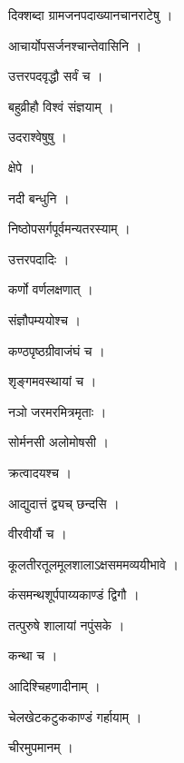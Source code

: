 \documentclass[10pt, openany]{book}
\begin{document}
\noindent दिक्शब्दा ग्रामजनपदाख्यानचानराटेषु ।

\noindent आचार्योपसर्जनश्चान्तेवासिनि ।

\noindent उत्तरपदवृद्धौ सर्वं च ।

\noindent बहुव्रीहौ विश्वं संज्ञयाम् ।

\noindent उदराश्वेषुषु ।

\noindent क्षेपे ।

\noindent नदी बन्धुनि ।

\noindent निष्ठोपसर्गपूर्वमन्यतरस्याम् ।

\noindent उत्तरपदादिः ।

\noindent कर्णो वर्णलक्षणात् ।

\noindent संज्ञौपम्ययोश्च ।

\noindent कण्ठपृष्ठग्रीवाजंघं च ।

\noindent श‍ृङ्गमवस्थायां च ।

\noindent नञो जरमरमित्रमृताः ।

\noindent सोर्मनसी अलोमोषसी ।

\noindent क्रत्वादयश्च ।

\noindent आद्युदात्तं द्व्यच् छन्दसि ।

\noindent वीरवीर्यौ च ।

\noindent कूलतीरतूलमूलशालाऽक्षसममव्ययीभावे ।

\noindent कंसमन्थशूर्पपाय्यकाण्डं द्विगौ ।

\noindent तत्पुरुषे शालायां नपुंसके ।

\noindent कन्था च ।

\noindent आदिश्चिहणादीनाम् ।

\noindent चेलखेटकटुककाण्डं गर्हायाम् ।

\noindent चीरमुपमानम् ।
\end{document}

